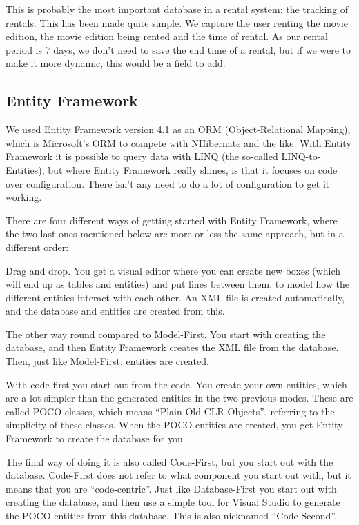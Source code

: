 This is probably the most important database in a rental system: the tracking of rentals. This has been made quite simple. We capture the user renting the movie edition, the movie edition being rented and the time of rental. As our rental period is 7 days, we don't need to save the end time of a rental, but if we were to make it more dynamic, this would be a field to add.

\subsection{Entity Framework}
\label{Design_Database_EntityFramework}

We used Entity Framework version 4.1 as an ORM (Object-Relational Mapping), which is Microsoft's ORM to compete with NHibernate and the like. With Entity Framework it is possible to query data with LINQ (the so-called LINQ-to-Entities), but where Entity Framework really shines, is that it focuses on code over configuration. There isn't any need to do a lot of configuration to get it working.

There are four different ways of getting started with Entity Framework, where the two last ones mentioned below are more or less the same approach, but in a different order:

\begin{my_description}
\item[Model-First] Drag and drop. You get a visual editor where you can create new boxes (which will end up as tables and entities) and put lines between them, to model how the different entities interact with each other. An XML-file is created automatically, and the database and entities are created from this.
\item[Database-First] The other way round compared to Model-First. You start with creating the database, and then Entity Framework creates the XML file from the database. Then, just like Model-First, entities are created.
\item[Code-First] With code-first you start out from the code. You create your own entities, which are a lot simpler than the generated entities in the two previous modes. These are called POCO-classes, which means ``Plain Old CLR Objects'', referring to the simplicity of these classes. When the POCO entities are created, you get Entity Framework to create the database for you.
\item[Code-First] The final way of doing it is also called Code-First, but you start out with the database. Code-First does not refer to what component you start out with, but it means that you are ``code-centric''. Just like Database-First you start out with creating the database, and then use a simple tool for Visual Studio to generate the POCO entities from this database. This is also nicknamed ``Code-Second''.
\end{my_description}

